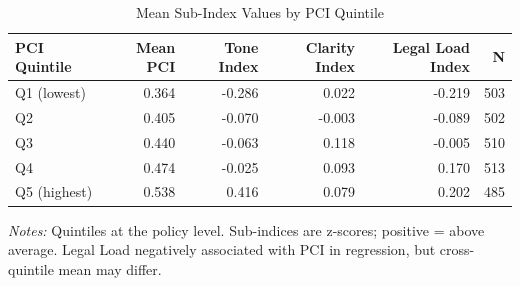 \begin{table}[H]
\centering
\caption{Mean Sub-Index Values by PCI Quintile}
\label{tab:table10_quintile}
\begin{threeparttable}
\small
\begin{tabular}{lrrrrr}
\toprule
\textbf{PCI Quintile} & \textbf{Mean PCI} & \textbf{Tone Index} & \textbf{Clarity Index} & \textbf{Legal Load Index} & \textbf{N} \\
\midrule
Q1 (lowest) & 0.364 & -0.286 & 0.022 & -0.219 & 503 \\
Q2 & 0.405 & -0.070 & -0.003 & -0.089 & 502 \\
Q3 & 0.440 & -0.063 & 0.118 & -0.005 & 510 \\
Q4 & 0.474 & -0.025 & 0.093 & 0.170 & 513 \\
Q5 (highest) & 0.538 & 0.416 & 0.079 & 0.202 & 485 \\
\bottomrule
\end{tabular}
\begin{tablenotes}\small
\item \textit{Notes:} Quintiles at the policy level. Sub-indices are z-scores; positive = above average. Legal Load negatively associated with PCI in regression, but cross-quintile mean may differ.
\end{tablenotes}
\end{threeparttable}
\end{table}